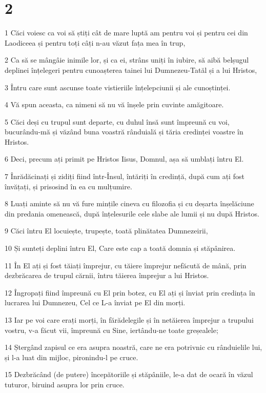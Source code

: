 \chapter{2}

\par 1 Căci voiesc ca voi să știți cât de mare luptă am pentru voi și pentru cei din Laodiceea și pentru toți câți n-au văzut fața mea în trup,
\par 2 Ca să se mângâie inimile lor, și ca ei, strâns uniți în iubire, să aibă belșugul deplinei înțelegeri pentru cunoașterea tainei lui Dumnezeu-Tatăl și a lui Hristos,
\par 3 Întru care sunt ascunse toate vistieriile înțelepciunii și ale cunoștinței.
\par 4 Vă spun aceasta, ca nimeni să nu vă înșele prin cuvinte amăgitoare.
\par 5 Căci deși cu trupul sunt departe, cu duhul însă sunt împreună cu voi, bucurându-mă și văzând buna voastră rânduială și tăria credinței voastre în Hristos.
\par 6 Deci, precum ați primit pe Hristos Iisus, Domnul, așa să umblați întru El.
\par 7 Înrădăcinați și zidiți fiind într-Însul, întăriți în credință, după cum ați fost învățați, și prisosind în ea cu mulțumire.
\par 8 Luați aminte să nu vă fure mințile cineva cu filozofia și cu deșarta înșelăciune din predania omenească, după înțelesurile cele slabe ale lumii și nu după Hristos.
\par 9 Căci întru El locuiește, trupește, toată plinătatea Dumnezeirii,
\par 10 Și sunteți deplini întru El, Care este cap a toată domnia și stăpânirea.
\par 11 În El ați și fost tăiați împrejur, cu tăiere împrejur nefăcută de mână, prin dezbrăcarea de trupul cărnii, întru tăierea împrejur a lui Hristos.
\par 12 Îngropați fiind împreună cu El prin botez, cu El ați și înviat prin credința în lucrarea lui Dumnezeu, Cel ce L-a înviat pe El din morți.
\par 13 Iar pe voi care erați morți, în fărădelegile și în netăierea împrejur a trupului vostru, v-a făcut vii, împreună cu Sine, iertându-ne toate greșealele;
\par 14 Ștergând zapisul ce era asupra noastră, care ne era potrivnic cu rânduielile lui, și l-a luat din mijloc, pironindu-l pe cruce.
\par 15 Dezbrăcând (de putere) începătoriile și stăpâniile, le-a dat de ocară în văzul tuturor, biruind asupra lor prin cruce.

